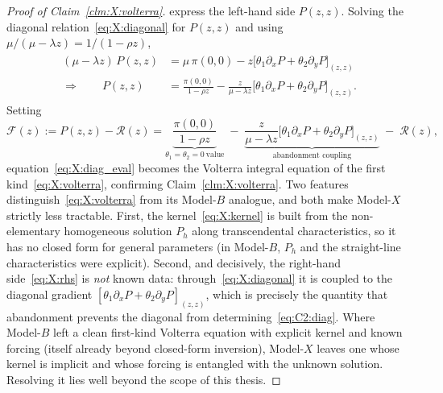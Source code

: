 \begin{proof}[Proof of Claim~\ref{clm:X:volterra}]
express the left-hand side $P(z,z)$. Solving the diagonal
relation~\eqref{eq:X:diagonal} for $P(z,z)$ and using
$\mu/(\mu-\lambda z)=1/(1-\rho z)$,
\begin{align*}
    \begin{split}
        (\mu-\lambda z)\,P(z,z)
        &= \mu\,\pi(0,0)
        - z\bigl[\theta_1\partial_x P+\theta_2\partial_y P\bigr]_{(z,z)} \\
        \Longrightarrow\qquad
        P(z,z)
        &= \frac{\pi(0,0)}{1-\rho z}
        - \frac{z}{\mu-\lambda z}
          \bigl[\theta_1\partial_x P+\theta_2\partial_y P\bigr]_{(z,z)} .
    \end{split}
\end{align*}
Setting
\begin{equation}
    \mathcal{F}(z) := P(z,z) - \mathcal{R}(z)
    = \underbrace{\frac{\pi(0,0)}{1-\rho z}}_{\theta_1=\theta_2=0\ \text{value}}
      \;-\;\underbrace{\frac{z}{\mu-\lambda z}
        \bigl[\theta_1\partial_x P + \theta_2\partial_y P\bigr]_{(z,z)}}_{\text{abandonment coupling}}
      \;-\;\mathcal{R}(z),
    \label{eq:X:rhs}
\end{equation}
equation~\eqref{eq:X:diag_eval} becomes the Volterra
integral equation of the first kind~\eqref{eq:X:volterra}, confirming
Claim~\ref{clm:X:volterra}.
Two features distinguish~\eqref{eq:X:volterra} from its Model-$B$ analogue, and both make
Model-$X$ strictly less tractable. First, the kernel~\eqref{eq:X:kernel} is built from the
non-elementary homogeneous solution $P_h$ along transcendental characteristics, so it has
no closed form for general parameters (in Model-$B$, $P_h$ and the straight-line
characteristics were explicit). Second, and decisively, the right-hand
side~\eqref{eq:X:rhs} is \emph{not} known data: through~\eqref{eq:X:diagonal} it is
coupled to the diagonal gradient $[\theta_1\partial_x P+\theta_2\partial_y P]_{(z,z)}$,
which is precisely the quantity that abandonment prevents the diagonal from
determining~\eqref{eq:C2:diag}. Where Model-$B$ left a clean first-kind Volterra equation
with explicit kernel and known forcing (itself already beyond closed-form inversion),
Model-$X$ leaves one whose kernel is implicit and whose forcing is entangled with the
unknown solution. Resolving it lies well beyond the scope of this thesis.
\end{proof}

